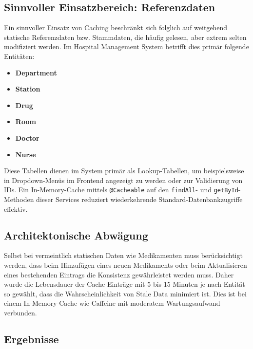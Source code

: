\subsection{Sinnvoller Einsatzbereich: Referenzdaten}
Ein sinnvoller Einsatz von Caching beschränkt sich folglich auf weitgehend statische Referenzdaten bzw. Stammdaten, die häufig gelesen, aber extrem selten modifiziert werden. 
Im Hospital Management System betrifft dies primär folgende Entitäten:
\begin{itemize}
    \item \textbf{Department}
    \item \textbf{Station}
    \item \textbf{Drug}
    \item \textbf{Room}
    \item \textbf{Doctor}
    \item \textbf{Nurse}
\end{itemize}

Diese Tabellen dienen im System primär als Lookup-Tabellen, um beispielsweise in Dropdown-Menüs im Frontend angezeigt zu werden oder zur Validierung von IDs. 
Ein In-Memory-Cache mittels \texttt{@Cacheable} auf den \texttt{findAll}- und \texttt{getById}-Methoden dieser Services reduziert wiederkehrende Standard-Datenbankzugriffe effektiv.

\subsection{Architektonische Abwägung}
Selbst bei vermeintlich statischen Daten wie Medikamenten muss berücksichtigt werden, dass beim Hinzufügen eines neuen Medikaments oder beim Aktualisieren eines bestehenden Eintrags die Konsistenz gewährleistet werden muss. 
Daher wurde die Lebensdauer der Cache-Einträge mit 5 bis 15 Minuten je nach Entität so gewählt, dass die Wahrscheinlichkeit von Stale Data minimiert ist.
Dies ist bei einem In-Memory-Cache wie Caffeine mit moderatem Wartungsaufwand verbunden.


\subsection{Ergebnisse}

